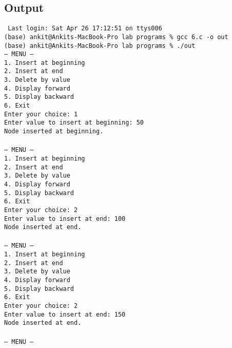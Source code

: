 \documentclass[12pt,a4paper]{article}
\begin{document}
\subsection*{Output}
\begin{tcolorbox}[terminalstyle, title=Sample Output]
\texttt{
Last login: Sat Apr 26 17:12:51 on ttys006\\
(base) ankit@Ankits-MacBook-Pro lab programs \% gcc 6.c -o out\\
(base) ankit@Ankits-MacBook-Pro lab programs \% ./out\\
--- MENU ---\\
1. Insert at beginning\\
2. Insert at end\\
3. Delete by value\\
4. Display forward\\
5. Display backward\\
6. Exit\\
Enter your choice: 1\\
Enter value to insert at beginning: 50\\
Node inserted at beginning.\\
\\
--- MENU ---\\
1. Insert at beginning\\
2. Insert at end\\
3. Delete by value\\
4. Display forward\\
5. Display backward\\
6. Exit\\
Enter your choice: 2\\
Enter value to insert at end: 100\\
Node inserted at end.\\
\\
--- MENU ---\\
1. Insert at beginning\\
2. Insert at end\\
3. Delete by value\\
4. Display forward\\
5. Display backward\\
6. Exit\\
Enter your choice: 2\\
Enter value to insert at end: 150\\
Node inserted at end.\\
\\
--- MENU ---\\
}
\end{tcolorbox}
\end{document}
